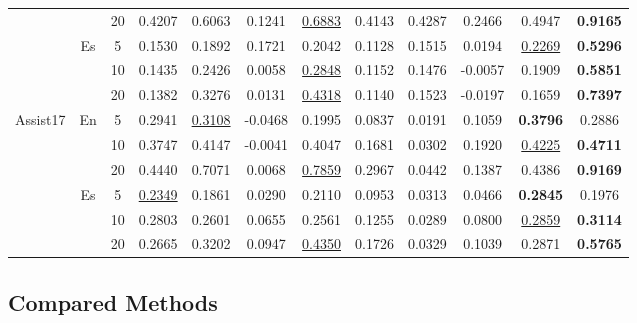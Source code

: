 \documentclass[11pt,a4paper]{article}
\begin{document}
\begin{table}[t]
{\begin{tabular}{cccccccccccc}
 &  & 20 & 0.4207 & 0.6063 & 0.1241 & \underline{0.6883} & 0.4143 & 0.4287 & 0.2466 & 0.4947 & \textbf{0.9165} \\
\cmidrule(lr){2-12}
 & \multirow[c]{3}{*}{Es} & 5  & 0.1530 & 0.1892 & 0.1721 & 0.2042 & 0.1128 & 0.1515 & 0.0194 & \underline{0.2269} & \textbf{0.5296} \\
 &  & 10 & 0.1435 & 0.2426 & 0.0058 & \underline{0.2848} & 0.1152 & 0.1476 & -0.0057 & 0.1909 & \textbf{0.5851} \\
 &  & 20 & 0.1382 & 0.3276 & 0.0131 & \underline{0.4318} & 0.1140 & 0.1523 & -0.0197 & 0.1659 & \textbf{0.7397} \\
\midrule
\multirow[c]{6}{*}{Assist17} & \multirow[c]{3}{*}{En} & 5  & 0.2941 & \underline{0.3108} & -0.0468 & 0.1995 & 0.0837 & 0.0191 & 0.1059 & \textbf{0.3796} & 0.2886 \\
 &  & 10 & 0.3747 & 0.4147 & -0.0041 & 0.4047 & 0.1681 & 0.0302 & 0.1920 & \underline{0.4225} & \textbf{0.4711} \\
 &  & 20 & 0.4440 & 0.7071 & 0.0068 & \underline{0.7859} & 0.2967 & 0.0442 & 0.1387 & 0.4386 & \textbf{0.9169} \\
\cmidrule(lr){2-12}
 & \multirow[c]{3}{*}{Es} & 5  & \underline{0.2349} & 0.1861 & 0.0290 & 0.2110 & 0.0953 & 0.0313 & 0.0466 & \textbf{0.2845} & 0.1976 \\
 &  & 10 & 0.2803 & 0.2601 & 0.0655 & 0.2561 & 0.1255 & 0.0289 & 0.0800 & \underline{0.2859} & \textbf{0.3114} \\
 &  & 20 & 0.2665 & 0.3202 & 0.0947 & \underline{0.4350} & 0.1726 & 0.0329 & 0.1039 & 0.2871 & \textbf{0.5765} \\
\bottomrule
\end{tabular}
}
\end{table}

\subsection{Compared Methods}
\end{document}
